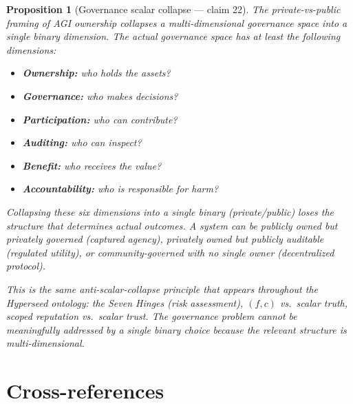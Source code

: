 \documentclass[11pt,a4paper]{article}
\newtheorem{proposition}[definition]{Proposition}
\begin{document}
\begin{proposition}[Governance scalar collapse --- claim 22]
\label{prop:scalar}
The private-vs-public framing of AGI ownership collapses a
multi-dimensional governance space into a single binary dimension.
The actual governance space has at least the following dimensions:
\begin{itemize}
\item \textbf{Ownership:} who holds the assets?
\item \textbf{Governance:} who makes decisions?
\item \textbf{Participation:} who can contribute?
\item \textbf{Auditing:} who can inspect?
\item \textbf{Benefit:} who receives the value?
\item \textbf{Accountability:} who is responsible for harm?
\end{itemize}

Collapsing these six dimensions into a single binary
(private/public) loses the structure that determines actual
outcomes. A system can be publicly owned but privately governed
(captured agency), privately owned but publicly auditable
(regulated utility), or community-governed with no single owner
(decentralized protocol).

This is the same anti-scalar-collapse principle that appears
throughout the Hyperseed ontology: the Seven Hinges (risk
assessment), $(f,c)$ vs.\ scalar truth, scoped reputation vs.\
scalar trust. The governance problem cannot be meaningfully
addressed by a single binary choice because the relevant
structure is multi-dimensional.
\end{proposition}


\section{Cross-references}
\end{document}
